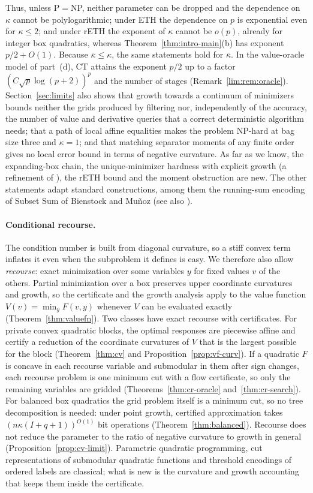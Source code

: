 Thus, unless P${}={}$NP, neither parameter can be dropped and the dependence
on $\kappa$ cannot be polylogarithmic; under ETH the dependence on $p$ is
exponential even for $\kappa\le2$; and under rETH the exponent of $\kappa$
cannot be $o(p)$, already for integer box quadratics, whereas
Theorem~\ref{thm:intro-main}(b) has exponent $p/2+O(1)$. Because
$\bar\kappa\le\kappa$, the same statements hold for $\bar\kappa$. In the
value-oracle model of part~(d), CT attains the exponent $p/2$ up to a factor
$(C\sqrt p\log(p+2))^p$ and the number of stages
(Remark~\ref{lim:rem:oracle}). Section~\ref{sec:limits} also shows that
growth towards a continuum of minimizers bounds neither the grids produced by
filtering nor, independently of the accuracy, the number of value and
derivative queries that a correct deterministic algorithm needs; that a path of local affine equalities makes the problem
NP-hard at bag size three and $\kappa=1$; and that matching separator
moments of any finite order gives no local error bound in terms of negative
curvature.
As far as we know, the expanding-box chain, the unique-minimizer hardness
with explicit growth (a refinement of \cite[Remark~2]{DelPiaKhajavirad2026}),
the rETH bound and the moment obstruction are new. The other statements
adapt standard constructions, among them the running-sum encoding of Subset
Sum of Bienstock and Mu\~noz \cite{BienstockMunoz2018} (see also
\cite[Example~1.1]{CifuentesParrilo2016}).
\paragraph{Conditional recourse.}
The condition number is built from diagonal curvature, so a stiff convex
term inflates it even when the subproblem it defines is easy. We therefore
also allow \emph{recourse}: exact minimization over some variables $y$ for
fixed values $v$ of the others. Partial minimization over a box preserves
upper coordinate curvatures and growth, so the certificate and the growth
analysis apply to the value function $V(v)=\min_yF(v,y)$ whenever $V$ can be
evaluated exactly (Theorem~\ref{thm:valuefn}). Two classes have exact recourse with
certificates. For private convex quadratic blocks, the optimal responses are
piecewise affine and certify a reduction of the coordinate curvatures of $V$
that is the largest possible for the block (Theorem~\ref{thm:cv} and
Proposition~\ref{prop:vf-curv}). If a quadratic $F$ is concave in each
recourse variable and submodular in them after sign changes, each recourse
problem is one minimum cut with a flow certificate, so only the remaining
variables are gridded (Theorems~\ref{thm:cr-oracle} and~\ref{thm:cr-search}).
For balanced box quadratics the grid problem itself is a minimum cut, so no
tree decomposition is needed: under point growth, certified approximation
takes $(n\kappa(I+q+1))^{O(1)}$ bit operations (Theorem~\ref{thm:balanced}).
Recourse does not reduce the parameter to the ratio of negative curvature to
growth in general (Proposition~\ref{prop:cv-limit}). Parametric quadratic
programming, cut representations of submodular quadratic functions and
threshold encodings of ordered labels are classical; what is new is the
curvature and growth accounting that keeps them inside the certificate.
